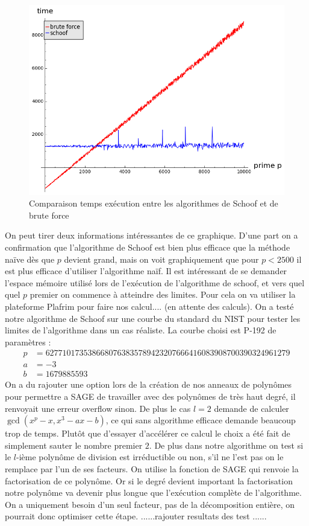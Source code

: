\documentclass[12pt]{article}
\begin{document}
\begin{figure}[h!]
\caption{Comparaison temps exécution entre les algorithmes de Schoof et de brute force}
\includegraphics[scale=0.6]{pictures/schoof_vs_bruteforce.png} 
\end{figure}
On peut tirer deux informations intéressantes de ce graphique. D'une part on a confirmation que l'algorithme de Schoof est bien plus efficace que la méthode naïve dès que $p$ devient grand, mais on voit graphiquement que pour $p<2500$ il est plus efficace d'utiliser l'algorithme naïf.
\newline
Il est intéressant de se demander l'espace mémoire utilisé lors de l’exécution de l'algorithme de schoof, et vers quel quel $p$ premier on commence à atteindre des limites. Pour cela on va utiliser la plateforme Plafrim pour faire nos calcul....  (en attente des calculs). 
\newline
On a testé notre algorithme de Schoof sur une courbe du standard du NIST pour tester les limites de l'algorithme dans un cas réaliste. La courbe choisi est P-192 de paramètres :
\begin{align*}
p &= 6277101735386680763835789423207666416083908700390324961279\\
a &= -3 \\
b &= 1679885593
\end{align*}
On a du rajouter une option  lors de la création de nos anneaux de polynômes pour permettre a SAGE de travailler avec des polynômes de très haut degré, il renvoyait une erreur overflow sinon. De plus le cas $l=2$ demande de calculer  $\gcd(x^p -x, x^3 - ax -b)$, ce qui sans algorithme efficace demande beaucoup trop de temps. Plutôt que d'essayer d’accélérer ce calcul le choix a été fait de simplement sauter le nombre premier $2$. De plus dans notre algorithme on test si le $l$-ième polynôme de division est irréductible ou non, s'il ne l'est pas on le remplace par l'un de ses facteurs. On utilise la fonction de SAGE  qui renvoie la factorisation de ce polynôme. Or si le degré devient important la factorisation notre polynôme va devenir plus longue que l’exécution complète de l'algorithme. On a uniquement besoin d'un seul facteur, pas de la décomposition entière, on pourrait donc optimiser cette étape.
......rajouter resultats des test ......
\end{document}

